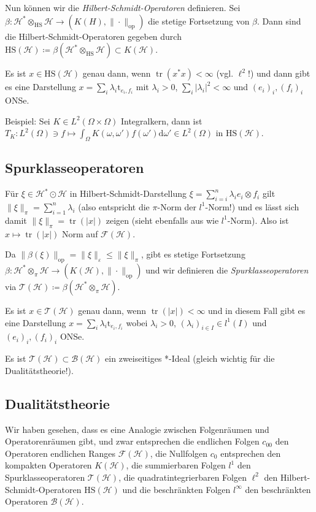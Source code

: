 \documentclass[11pt,a4paper]{scrartcl}
\newcommand{\Hc}{\mathcal{H}}
\newcommand{\B}{\mathcal{B}}
\newcommand{\F}{\mathcal{F}}
\newcommand{\T}{\mathcal{T}}
\theoremstyle{plain}
\theoremstyle{definition}
\theoremstyle{remark}
\DeclareMathOperator{\tr}{tr}
\begin{document}
Nun können wir die \emph{Hilbert-Schmidt-Operatoren} definieren. Sei $\beta: \Hc^*\otimes_\mathrm{HS} \Hc \to (K(H), \|\cdot\|_\mathrm{op})$ die stetige Fortsetzung von $\beta$. Dann sind die Hilbert-Schmidt-Operatoren gegeben durch $\mathrm{HS}(\Hc) \coloneqq \beta(\Hc^*\otimes_\mathrm{HS}\Hc) \subset K(\Hc)$. 

Es ist $x\in \mathrm{HS}(\Hc)$ genau dann, wenn $\tr(x^*x)<\infty$ (vgl. $\ell^2$!) und dann gibt es eine Darstellung $x=\sum_i \lambda_i \mathrm{t}_{e_i,f_i}$ mit $\lambda_i > 0$, $\sum_i |\lambda_i|^2 < \infty$ und $(e_i)_i, (f_i)_i$ ONSe.

Beispiel: Sei $K\in L^2(\Omega\times \Omega)$ Integralkern, dann ist $T_K: L^2(\Omega) \ni f \mapsto \int_\Omega K(\omega,\omega')f(\omega')\mathrm{d}\omega' \in L^2(\Omega)$ in $\mathrm{HS}(\Hc)$.

\subsection{Spurklasseoperatoren}

Für $\xi\in \Hc^*\odot \Hc$ in Hilbert-Schmidt-Darstellung $\xi=\sum_{i=i}^n \lambda_i e_i\otimes f_i$ gilt $\|\xi\|_\pi = \sum_{i=1}^n \lambda_i$ (also entspricht  die $\pi$-Norm der $l^1$-Norm!) und es lässt sich damit $\|\xi\|_\pi = \tr(|x|)$ zeigen (sieht ebenfalls aus wie $l^1$-Norm). Also ist $x\mapsto \tr(|x|)$ Norm auf $\F(\Hc)$.

Da $\|\beta(\xi)\|_\mathrm{op} = \|\xi\|_\varepsilon \leq \|\xi\|_\pi$, gibt es stetige Fortsetzung $\beta: \Hc^*\otimes_\pi \Hc \to (K(\Hc),\|\cdot\|_\mathrm{op})$ und wir definieren die \emph{Spurklasseoperatoren} via $\T(\Hc)\coloneqq \beta(\Hc^*\otimes_\pi \Hc)$.

Es ist $x\in \T(\Hc)$ genau dann, wenn $\tr(|x|)<\infty$ und in diesem Fall gibt es eine Darstellung $x=\sum_i \lambda_i \mathrm{t}_{e_i,f_i}$ wobei $\lambda_i > 0$, $(\lambda_i)_{i\in I}\in l^1(I)$ und $(e_i)_i, (f_i)_i$ ONSe.

Es ist $\T(\Hc)\subset \B(\Hc)$ ein zweiseitiges *-Ideal (gleich wichtig für die Dualitätstheorie!).  

\subsection{Dualitätstheorie}

Wir haben gesehen, dass es eine Analogie zwischen Folgenräumen und Operatorenräumen gibt, und zwar entsprechen die endlichen Folgen $c_{00}$ den Operatoren endlichen Ranges $\F(\Hc)$, die Nullfolgen $c_0$ entsprechen den kompakten Operatoren $K(\Hc)$, die summierbaren Folgen $l^1$ den Spurklasseoperatoren $\T(\Hc)$, die quadratintegrierbaren Folgen $\ell^2$ den Hilbert-Schmidt-Operatoren $\mathrm{HS}(\Hc)$ und die beschränkten Folgen $l^\infty$ den beschränkten Operatoren $\B(\Hc)$.
\end{document}
